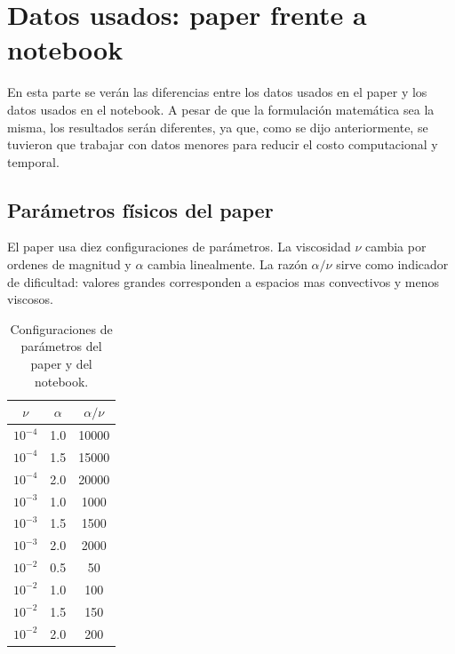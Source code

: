 \documentclass[10pt,letterpaper,twocolumn]{article}
\begin{document}
\section{Datos usados: paper frente a notebook}

En esta parte se verán las diferencias entre los datos usados en el paper y los datos usados en el notebook. A pesar de que la formulación matemática sea la misma, los resultados serán diferentes, ya que, como se dijo anteriormente, se tuvieron que trabajar con datos menores para reducir el costo computacional y temporal.

\subsection{Parámetros físicos del paper}

El paper usa diez configuraciones de parámetros. La viscosidad $\nu$ cambia por ordenes de magnitud y $\alpha$ cambia linealmente. La razón $\alpha/\nu$ sirve como indicador de dificultad: valores grandes corresponden a espacios mas convectivos y menos viscosos.

\begin{table}[H]
\centering
\caption{Configuraciones de parámetros del paper y del notebook.}
\begin{tabular}{ccc}
\toprule
$\nu$ & $\alpha$ & $\alpha/\nu$ \\
\midrule
$10^{-4}$ & 1.0 & 10000 \\
$10^{-4}$ & 1.5 & 15000 \\
$10^{-4}$ & 2.0 & 20000 \\
$10^{-3}$ & 1.0 & 1000 \\
$10^{-3}$ & 1.5 & 1500 \\
$10^{-3}$ & 2.0 & 2000 \\
$10^{-2}$ & 0.5 & 50 \\
$10^{-2}$ & 1.0 & 100 \\
$10^{-2}$ & 1.5 & 150 \\
$10^{-2}$ & 2.0 & 200 \\
\bottomrule
\end{tabular}
\end{table}
\end{document}
